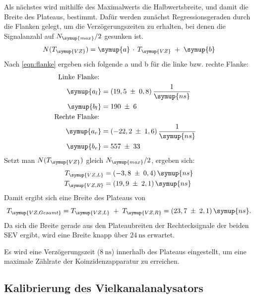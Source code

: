 \noindent
Als nächstes wird mithilfe des
Maximalwerts die Halbwertsbreite, und damit die Breite des Plateaus, bestimmt.
Dafür werden zunächst Regressionsgeraden durch die Flanken gelegt, um die Verzögerungszeiten
zu erhalten, bei denen die Signalanzahl auf $N_{\symup{max}}/2$ gesunken ist.
\begin{equation}
  N(T_{\symup{VZ}}) = \symup{a}\,\cdot\,T_{\symup{VZ}}\;+\;\symup{b}
  \label{eqn:flanke}
\end{equation}
Nach \ref{eqn:flanke} ergeben sich folgende a und b für die linke bzw. rechte Flanke:
\begin{align*}
  \text{Linke Flanke:\;}\\
  \symup{a_l} &= (19,5\;\pm\;0,8)\,\frac{1}{\symup{ns}}\\
  \symup{b_l} &= 190\;\pm\;6\\
  \text{Rechte Flanke:\;}\\
  \symup{a_r} &= (-22,2\;\pm\;1,6)\,\frac{1}{\symup{ns}}\\
  \symup{b_r} &= 557\;\pm\;33\\
\end{align*}
Setzt man $N(T_{\symup{VZ}})$ gleich $N_{\symup{max}}/2$, ergeben sich:
\begin{align*}
  T_{\symup{VZ,L}} &= (-3,8\;\pm\;0,4)\,\symup{ns}\\
  T_{\symup{VZ,R}} &= (19,9\;\pm\;2,1)\,\symup{ns}\\
\end{align*}
Damit ergibt sich eine Breite des Plateaus von
\begin{equation*}
  T_{\symup{VZ,Gesamt}} = T_{\symup{VZ,L}}\;+\;T_{\symup{VZ,R}} = (23,7\;\pm\;2,1)\,\symup{ns}.
\end{equation*}
Da sich die Breite gerade aus den Plateaubreiten der Rechtecksignale der beiden SEV
ergibt, wird eine Breite knapp über $\SI{24}{\nano\second}$ erwartet. %

Es wird eine Verzögerungszeit ($\SI{8}{\nano\second}$) innerhalb des Plateaus eingestellt, um eine
maximale Zählrate der Koinzidenzapparatur zu erreichen.

\subsection{Kalibrierung des Vielkanalanalysators}
\label{sec:vielkanalanalysator}

